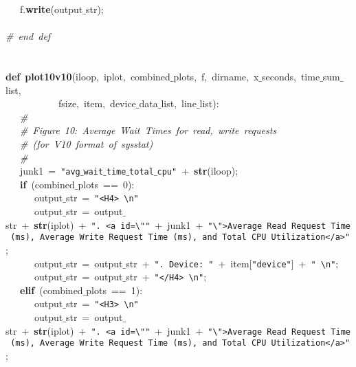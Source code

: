 \mbox{}\ \ \ f.\textbf{write}(output$\_$str); \\
\mbox{}\ \ \  \\
\mbox{}\textit{\#\ end\ def} \\
\mbox{} \\
\mbox{} \\
\mbox{}\textbf{def}\ \textbf{plot10v10}(iloop,\ iplot,\ combined$\_$plots,\ f,\ dirname,\ x$\_$seconds,\ time$\_$sum$\_$list, \\
\mbox{}\ \ \ \ \ \ \ \ \ \ \ fsize,\ item,\ device$\_$data$\_$list,\ line$\_$list): \\
\mbox{}\ \ \ \textit{\#} \\
\mbox{}\ \ \ \textit{\#\ Figure\ 10:\ Average\ Wait\ Times\ for\ read,\ write\ requests} \\
\mbox{}\ \ \ \textit{\#\ (for\ V10\ format\ of\ sysstat)} \\
\mbox{}\ \ \ \textit{\#} \\
\mbox{}\ \ \ junk1\ =\ \texttt{"{}avg$\_$wait$\_$time$\_$total$\_$cpu"{}}\ +\ \textbf{str}(iloop); \\
\mbox{}\ \ \ \textbf{if}\ (combined$\_$plots\ ==\ 0): \\
\mbox{}\ \ \ \ \ \ output$\_$str\ =\ \texttt{"{}\textless{}H4\textgreater{}\ \textbackslash{}n"{}} \\
\mbox{}\ \ \ \ \ \ output$\_$str\ =\ output$\_$str\ +\ \textbf{str}(iplot)\ +\ \texttt{"{}.\ \textless{}a\ id=\textbackslash{}"{}"{}}\ +\ junk1\ +\ \texttt{"{}\textbackslash{}"{}\textgreater{}Average\ Read\ Request\ Time\ (ms),\ Average\ Write\ Request\ Time\ (ms),\ and\ Total\ CPU\ Utilization\textless{}/a\textgreater{}"{}}; \\
\mbox{}\ \ \ \ \ \ output$\_$str\ =\ output$\_$str\ +\ \texttt{"{}.\ Device:\ "{}}\ +\ item[\texttt{"{}device"{}}]\ +\ \texttt{"{}\ \textbackslash{}n"{}}; \\
\mbox{}\ \ \ \ \ \ output$\_$str\ =\ output$\_$str\ +\ \texttt{"{}\textless{}/H4\textgreater{}\ \textbackslash{}n"{}}; \\
\mbox{}\ \ \ \textbf{elif}\ (combined$\_$plots\ ==\ 1): \\
\mbox{}\ \ \ \ \ \ output$\_$str\ =\ \texttt{"{}\textless{}H3\textgreater{}\ \textbackslash{}n"{}} \\
\mbox{}\ \ \ \ \ \ output$\_$str\ =\ output$\_$str\ +\ \textbf{str}(iplot)\ +\ \texttt{"{}.\ \textless{}a\ id=\textbackslash{}"{}"{}}\ +\ junk1\ +\ \texttt{"{}\textbackslash{}"{}\textgreater{}Average\ Read\ Request\ Time\ (ms),\ Average\ Write\ Request\ Time\ (ms),\ and\ Total\ CPU\ Utilization\textless{}/a\textgreater{}"{}}; \\
